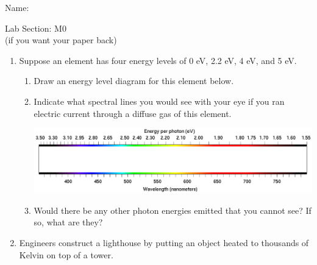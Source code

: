 \documentclass[12pt]{article}
\begin{document}
\Large
\centerline{}

\vspace{1em}


\begin{minipage}{0.6\textwidth}
	Name: \underline{\hspace{3in}}
\end{minipage}
\begin{minipage}{0.4\textwidth}
	\Large
	Lab Section: M0\underline{\hspace{1in}}\\
	\small (if you want your paper back)
\end{minipage}


\normalsize

	\rm
	
	\begin{enumerate}
		\item Suppose an element has four energy levels of 0 eV, 2.2 eV, 4 eV, and  5 eV. 
		
		\begin{enumerate}
			\item Draw an energy level diagram for this element below.
			
			\vspace{4in}
			
			\item Indicate what spectral lines you would see with your eye if you ran electric current through a diffuse gas of this element.
			
			\begin{minipage}{\textwidth}

				\includegraphics[width=5.5in]{spectrum-blank.png}

			\end{minipage}
			
			\item Would there be any other photon energies emitted that you cannot see? If so, what are they?
		\end{enumerate}
	
	\newpage
	
	\item Engineers construct a lighthouse by putting an object heated to thousands of Kelvin on top of a tower. 
	

\end{enumerate}
\end{document}
